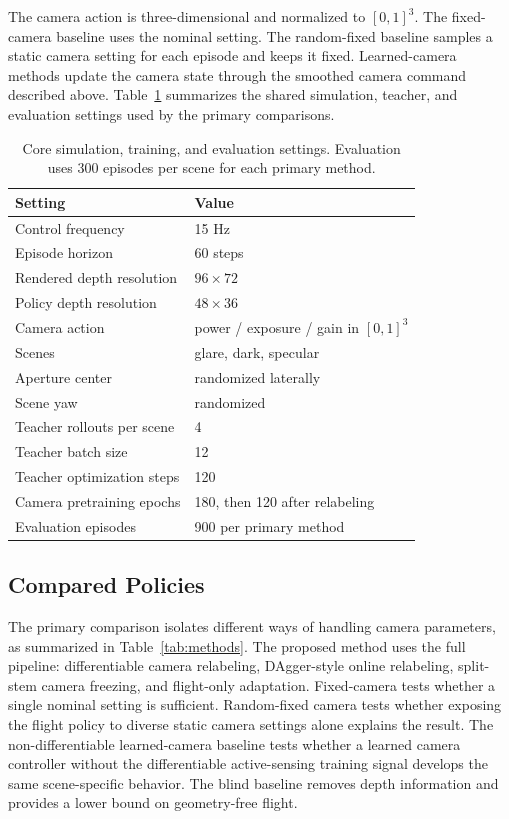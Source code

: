 \documentclass[letterpaper,journal]{IEEEtran}
\begin{document}
The camera action is three-dimensional and normalized to $[0,1]^3$. The
fixed-camera baseline uses the nominal setting. The random-fixed baseline
samples a static camera setting for each episode and keeps it fixed.
Learned-camera methods update the camera state through the smoothed camera
command described above.
Table~\ref{tab:setup} summarizes the shared simulation, teacher, and evaluation
settings used by the primary comparisons.

\begin{table}[t]
\centering
\small
\begin{tabular}{ll}
\toprule
Setting & Value \\
\midrule
Control frequency & 15 Hz \\
Episode horizon & 60 steps \\
Rendered depth resolution & $96 \times 72$ \\
Policy depth resolution & $48 \times 36$ \\
Camera action & power / exposure / gain in $[0,1]^3$ \\
Scenes & glare, dark, specular \\
Aperture center & randomized laterally \\
Scene yaw & randomized \\
Teacher rollouts per scene & 4 \\
Teacher batch size & 12 \\
Teacher optimization steps & 120 \\
Camera pretraining epochs & 180, then 120 after relabeling \\
Evaluation episodes & 900 per primary method \\
\bottomrule
\end{tabular}
\caption{Core simulation, training, and evaluation settings. Evaluation uses
300 episodes per scene for each primary method.}
\label{tab:setup}
\end{table}

\subsection{Compared Policies}
The primary comparison isolates different ways of handling camera parameters,
as summarized in Table~\ref{tab:methods}. The proposed method uses the full
pipeline: differentiable camera relabeling, DAgger-style online relabeling,
split-stem camera freezing, and flight-only adaptation. Fixed-camera tests
whether a single nominal setting is sufficient. Random-fixed camera tests
whether exposing the flight policy to diverse static camera settings alone
explains the result. The non-differentiable learned-camera baseline tests
whether a learned camera controller without the differentiable active-sensing
training signal develops the same scene-specific behavior. The blind baseline
removes depth information and provides a lower bound on geometry-free flight.
\end{document}
